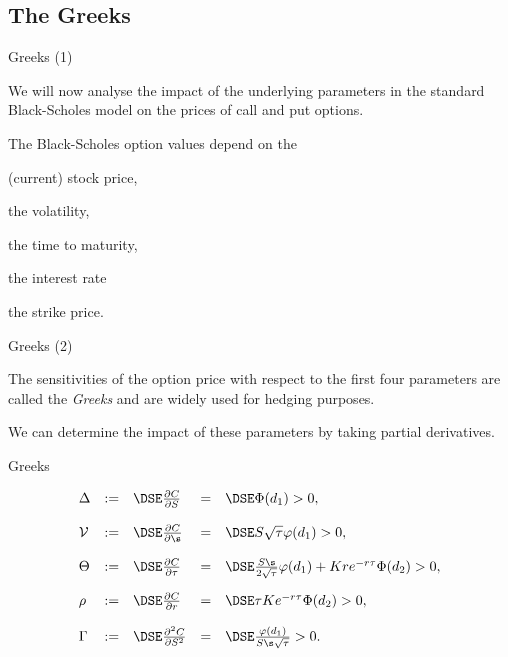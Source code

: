 \subsection{The Greeks}

{Greeks (1)}






	We will now analyse the impact of the
underlying parameters in the standard Black-Scholes model on the
prices of call and put options.


	
The Black-Scholes option values
depend on the






	(current) stock price,


	the volatility,


	the time to maturity,


	the interest rate


	the strike price.









{Greeks (2)}






	The
sensitivities of the option price with respect to the first four
parameters are called the {\it Greeks} and are widely used for
hedging purposes.


	
We can determine the impact of these parameters
by taking partial derivatives.





{Greeks}

$$
\begin{array}{lllll}
\Delta &:=&\DSE \frac{\partial C}{\partial S} &=&\DSE \Phi(d_1) >
0,\\*[12pt]
{\cal V} &:=&\DSE \frac{\partial C}{\partial \s} &=&
\DSE S \sqrt{\tau} \varphi(d_1) >0,\\*[12pt]
 \Theta &:=&\DSE \frac{\partial
C}{\partial \tau} &=& \DSE \frac{S \s}{2 \sqrt{\tau}} \varphi(d_1) + K r
e^{-r\tau} \Phi(d_2) >0,\\*[12pt]
\rho &:=&\DSE \frac{\partial
C}{\partial r} &=& \DSE \tau K e^{-r\tau} \Phi(d_2) >0,\\*[12pt] \Gamma
&:=&\DSE \frac{\partial^2 C}{\partial S^2} &=& \DSE
\frac{\varphi(d_1)}{S \s \sqrt{\tau}} >0.\\*[12pt]
\end{array}
$$

